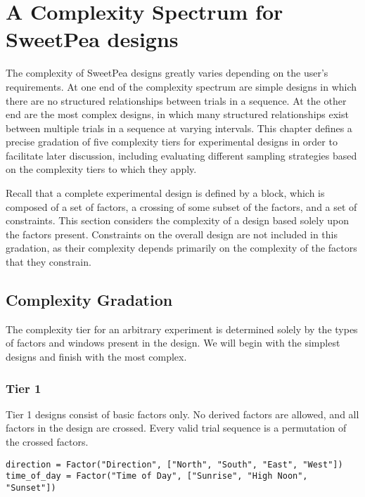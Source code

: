 
\chapter{A Complexity Spectrum for SweetPea designs}

The complexity of SweetPea designs greatly varies depending on the user's requirements. At one end of the complexity spectrum are simple designs in which there are no structured relationships between trials in a sequence. At the other end are the most complex designs, in which many structured relationships exist between multiple trials in a sequence at varying intervals. This chapter defines a precise gradation of five complexity tiers for experimental designs in order to facilitate later discussion, including evaluating different sampling strategies based on the complexity tiers to which they apply.

Recall that a complete experimental design is defined by a block, which is composed of a set of factors, a crossing of some subset of the factors, and a set of constraints. This section considers the complexity of a design based solely upon the factors present. Constraints on the overall design are not included in this gradation, as their complexity depends primarily on the complexity of the factors that they constrain.

\section{Complexity Gradation}

The complexity tier for an arbitrary experiment is determined solely by the types of factors and windows present in the design. We will begin with the simplest designs and finish with the most complex.

\subsection{Tier 1}

Tier 1 designs consist of basic factors only. No derived factors are allowed, and all factors in the design are crossed. Every valid trial sequence is a permutation of the crossed factors.

\begin{verbatim}
direction = Factor("Direction", ["North", "South", "East", "West"])
time_of_day = Factor("Time of Day", ["Sunrise", "High Noon", "Sunset"])
\end{verbatim}

